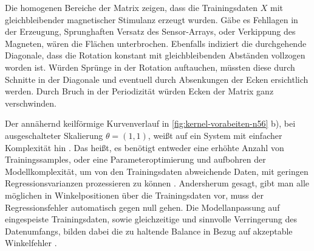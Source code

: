 \clearpage


Die homogenen Bereiche der Matrix zeigen, dass die Trainingsdaten $X$ mit gleichbleibender magnetischer Stimulanz erzeugt wurden. Gäbe es Fehllagen in der Erzeugung, Sprunghaften Versatz des Sensor-Arrays, oder Verkippung des Magneten, wären die Flächen unterbrochen. Ebenfalls indiziert die durchgehende Diagonale, dass die Rotation konstant mit gleichbleibenden Abständen vollzogen worden ist. Würden Sprünge in der Rotation auftauchen, müssten diese durch Schnitte in der Diagonale und eventuell durch Absenkungen der Ecken ersichtlich werden. Durch Bruch in der Periodizität würden Ecken der Matrix ganz verschwinden.


Der annähernd keilförmige Kurvenverlauf in \autoref{fig:kernel-vorabeiten-n56} b), bei ausgeschalteter Skalierung $\theta = (1,1)$, weißt auf ein System mit einfacher Komplexität hin \cite{Rasmussen2006}. Das heißt, es benötigt entweder eine erhöhte Anzahl von Trainingssamples, oder eine Parameteroptimierung und aufbohren der Modellkomplexität, um von den Trainingsdaten abweichende Daten, mit geringen Regressionsvarianzen prozessieren zu können \cite{Rasmussen2006}. Andersherum gesagt, gibt man alle möglichen in Winkelpositionen über die Trainingsdaten vor, muss der Regressionsfehler automatisch gegen null gehen. Die Modellanpassung auf eingespeiste Trainingsdaten, sowie gleichzeitige und sinnvolle Verringerung des Datenumfangs, bilden dabei die zu haltende Balance in Bezug auf akzeptable Winkelfehler \cite{Rasmussen2006}. 

 